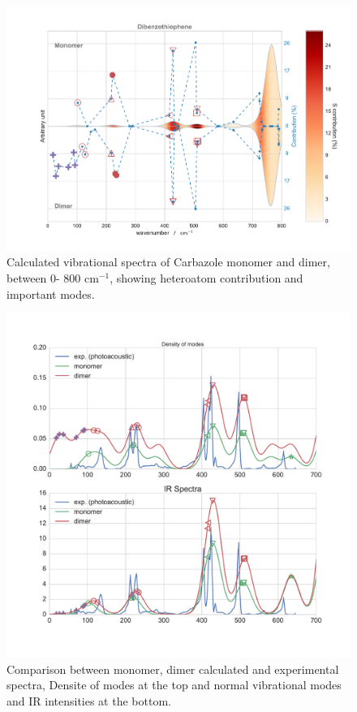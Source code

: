 	
		\begin{figure}[H]
			\begin{center}
				\includegraphics[scale=0.4]{image/P2-14}
			\end{center}
			\caption{Calculated vibrational spectra of Carbazole monomer and dimer, between 0- 800 cm$^{-1}$, showing heteroatom contribution and important modes.} \label{figP2-14}
		\end{figure}
		
		
			\begin{figure}[H]
				\begin{center}
					\includegraphics[scale=0.31]{image/P2-15}
				\end{center}
				\caption{Comparison between monomer, dimer calculated and experimental spectra, Densite of modes at the top and normal vibrational modes and IR intensities at the bottom.} \label{figP2-15}
			\end{figure}
	

